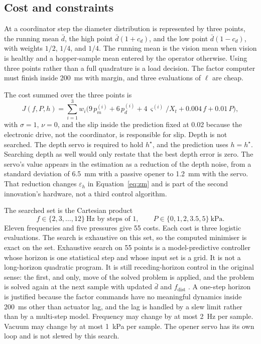 \subsection{Cost and constraints}

At a coordinator step the diameter distribution is represented by three points, the running mean $\bar d$, the high point $\bar d(1+c_d)$, and the low point $\bar d(1-c_d)$, with weights $1/2$, $1/4$, and $1/4$. The running mean is the vision mean when vision is healthy and a hopper-sample mean entered by the operator otherwise. Using three points rather than a full quadrature is a load decision. The factor computer must finish inside 200~ms with margin, and three evaluations of $\ell$ are cheap.

The cost summed over the three points is
\begin{equation}
J(f,P,h) = \sum_{i=1}^{3} w_i\Big(9\, p_m^{(i)} + 6\, p_d^{(i)} + 4\,\varsigma^{(i)}/X_t + 0.004\, f + 0.01\, P\Big),
\label{eq:cost}
\end{equation}
with $\sigma=1$, $\nu=0$, and the slip inside the prediction fixed at 0.02 because the electronic drive, not the coordinator, is responsible for slip. Depth is not searched. The depth servo is required to hold $h^{\star}$, and the prediction uses $h=h^{\star}$. Searching depth as well would only restate that the best depth error is zero. The servo's value appears in the estimation as a reduction of the depth noise, from a standard deviation of 6.5~mm with a passive opener to 1.2~mm with the servo. That reduction changes $\varepsilon_h$ in Equation~\eqref{eq:zm} and is part of the second innovation's hardware, not a third control algorithm.

The searched set is the Cartesian product
\begin{equation}
f\in\{2,3,\ldots,12\}~\text{Hz by steps of 1},\qquad
P\in\{0, 1, 2, 3.5, 5\}~\text{kPa}.
\label{eq:grid}
\end{equation}
Eleven frequencies and five pressures give 55 costs. Each cost is three logistic evaluations. The search is exhaustive on this set, so the computed minimiser is exact on the set. Exhaustive search on 55 points is a model-predictive controller whose horizon is one statistical step and whose input set is a grid. It is not a long-horizon quadratic program. It is still receding-horizon control in the original sense: the first, and only, move of the solved problem is applied, and the problem is solved again at the next sample with updated $\bar d$ and $f_{\mathrm{dist}}$ \cite{garcia1989,clarke1987}. A one-step horizon is justified because the factor commands have no meaningful dynamics inside 200~ms other than actuator lag, and the lag is handled by a slew limit rather than by a multi-step model. Frequency may change by at most 2~Hz per sample. Vacuum may change by at most 1~kPa per sample. The opener servo has its own loop and is not slewed by this search.

